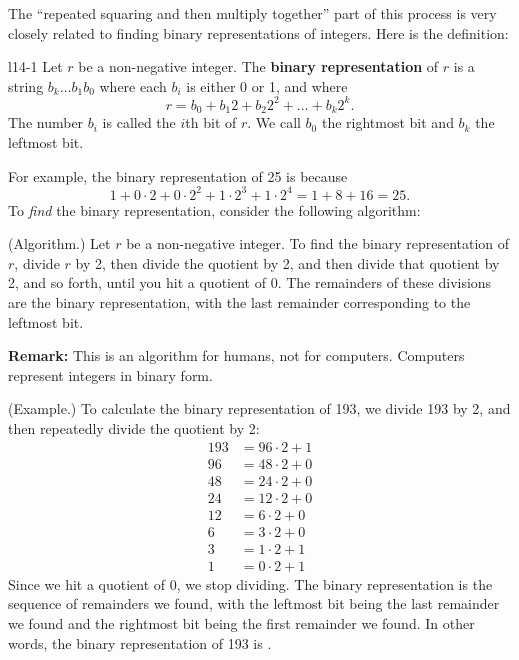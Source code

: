 \documentclass[letterpaper]{article}
\begin{document}
The ``repeated squaring and then multiply together'' part of this process is very closely related to finding binary representations of integers. Here is the definition: 
\begin{definition}{}{l14-1}
    Let $r$ be a non-negative integer. The \textbf{binary representation} of $r$ is a string $b_{k} \hdots b_{1}b_{0}$ where each $b_i$ is either 0 or 1, and where 
    \[r = b_0 + b_1 2 + b_2 2^2 + \hdots + b_k 2^k.\]
    The number $b_i$ is called the $i$th bit of $r$. We call $b_0$ the rightmost bit and $b_k$ the leftmost bit. 
\end{definition}
For example, the binary representation of 25 is  because \[1 + 0 \cdot 2 + 0 \cdot 2^2 + 1 \cdot 2^3 + 1 \cdot 2^4 = 1 + 8 + 16 = 25.\] To \emph{find} the binary representation, consider the following algorithm: 
\begin{mdframed}
    (Algorithm.) Let $r$ be a non-negative integer. To find the binary representation of $r$, divide $r$ by 2, then divide the quotient by 2, and then divide that quotient by 2, and so forth, until you hit a quotient of 0. The remainders of these divisions are the binary representation, with the last remainder corresponding to the leftmost bit. 
\end{mdframed}
\textbf{Remark:} This is an algorithm for humans, not for computers. Computers represent integers in binary form. 

\begin{mdframed}
    (Example.) To calculate the binary representation of 193, we divide 193 by 2, and then repeatedly divide the quotient by 2: 
    \begin{equation*}
        \begin{aligned}
            193 &= 96 \cdot 2 + 1 \\ 
            96 &= 48 \cdot 2 + 0 \\ 
            48 &= 24 \cdot 2 + 0 \\ 
            24 &= 12 \cdot 2 + 0 \\ 
            12 &= 6 \cdot 2 + 0 \\ 
            6 &= 3 \cdot 2 + 0 \\ 
            3 &= 1 \cdot 2 + 1 \\ 
            1 &= 0 \cdot 2 + 1
        \end{aligned}
    \end{equation*}
    Since we hit a quotient of 0, we stop dividing. The binary representation is the sequence of remainders we found, with the leftmost bit being the last remainder we found and the rightmost bit being the first remainder we found. In other words, the binary representation of 193 is .
\end{mdframed}
\end{document}
